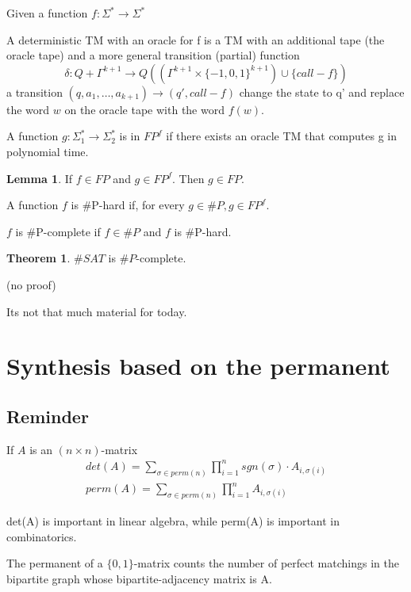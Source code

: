 \documentclass[a4paper,12pt]{article}
\theoremstyle{definition}
\newtheorem{lemma}[counter]{Lemma}
\newtheorem{theorem}[counter]{Theorem}
\theoremstyle{remark}
\begin{document}
Given a function $f: \Sigma^* \to \Sigma^*$

A deterministic TM with an oracle for f is a TM with an additional tape (the oracle tape) and a more general transition (partial) function
\begin{equation*}
    \delta: Q + \Gamma^{k+1} \to Q((\Gamma^{k+1} \times \{-1, 0, 1\}^{k+1}) \cup \{call-f\}) %
\end{equation*}
a transition $(q, a_1, \dots, a_{k+1}) \to (q', call-f)$
change the state to q' and replace the word $w$ on the oracle tape with the word $f(w)$.

A function $g: \Sigma_1^* \to \Sigma_2^*$ is in $FP^f$ if there exists an oracle TM 
that computes g in polynomial time.

\begin{lemma}
    If $f \in FP$ and $g \in FP^f$. Then $g \in FP$.
\end{lemma}

A function $f$ is $\#$P-hard if, for every $g \in \#P, g \in FP^f$.

$f$ is $\#$P-complete if $f \in \#P$ and $f$ is $\#$P-hard.

\begin{theorem}
    $\#SAT$ is $\#P$-complete.
\end{theorem}
(no proof)








\newpage
Its not that much material for today.
\section{Synthesis based on the permanent}

\subsection*{Reminder}
If $A$ is an $(n \times n)$-matrix
\begin{gather*}
    det(A) = \sum_{\sigma \in perm(n)} \prod_{i = 1}^{n} sgn(\sigma) \cdot A_{i, \sigma(i)} \\
    perm(A) = \sum_{\sigma \in perm(n)} \prod_{i = 1}^{n} A_{i, \sigma(i)}
\end{gather*}

det(A) is important in linear algebra, while perm(A) is important in combinatorics.

The permanent of a $\{0, 1\}$-matrix counts the number of perfect matchings in the bipartite graph whose bipartite-adjacency matrix is A.
\end{document}
